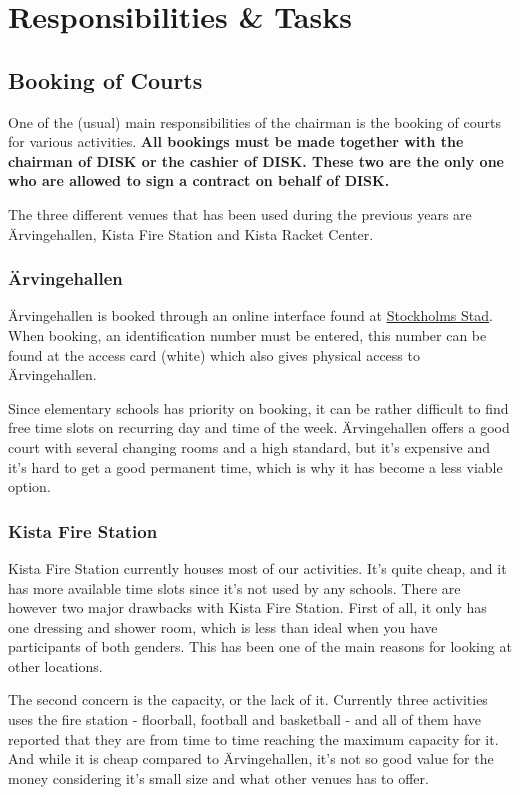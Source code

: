 \documentclass[12pt,a4paper]{article}
\begin{document}
	\section{Responsibilities \& Tasks}
		\subsection{Booking of Courts}
			One of the (usual) main responsibilities of the chairman is the booking of courts for various activities. \textbf{All bookings must be made together with the chairman of DISK or the cashier of DISK. These two are the only one who are allowed to sign a contract on behalf of DISK.}

			The three different venues that has been used during the previous years are Ärvingehallen, Kista Fire Station and Kista Racket Center.
			\subsubsection{Ärvingehallen}
			Ärvingehallen is booked through an online interface found at \href{http://booking.stockholm.se/}{Stockholms Stad}. When booking, an identification number must be entered, this number can be found at the access card (white) which also gives physical access to Ärvingehallen.

			Since elementary schools has priority on booking, it can be rather difficult to find free time slots on recurring day and time of the week. Ärvingehallen offers a good court with several changing rooms and a high standard, but it's expensive and  it's hard to get a good permanent time, which is why it has become a less viable option.
			\subsubsection{Kista Fire Station}
			Kista Fire Station currently houses most of our activities. It's quite cheap, and it has more available time slots since it's not used by any schools. There are however two major drawbacks with Kista Fire Station. First of all, it only has one dressing and shower room, which is less than ideal when you have participants of both genders. This has been one of the main reasons for looking at other locations.

			The second concern is the capacity, or the lack of it. Currently three activities uses the fire station - floorball, football and basketball -  and all of them have reported that they are from time to time reaching the maximum capacity for it. And while it is cheap compared to Ärvingehallen, it's not so good value for the money considering it's small size and what other venues has to offer.
\end{document}
